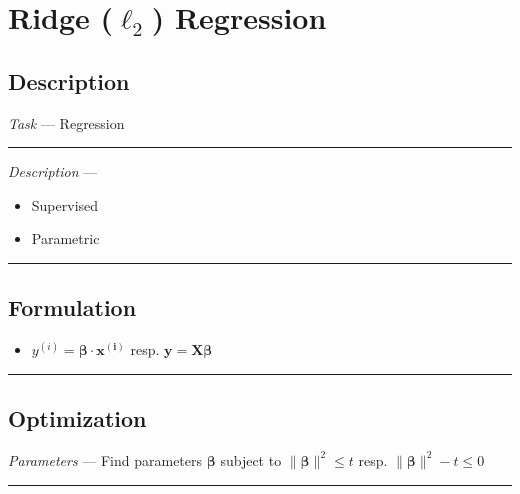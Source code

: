 \section{Ridge ($\ell_2$) Regression}
\subsection*{Description}
\emph{Task} --- Regression

{\color{lightgray}\hrule height 0.001mm}

\emph{Description} --- 
\begin{itemize}
    \item Supervised 
    \item Parametric
\end{itemize}

{\color{black}\hrule height 0.001mm}

\subsection*{Formulation}

\begin{itemize}
    \item $y^{(i)} = \boldsymbol{\beta} \cdot \boldsymbol{x^{(i)}}$ resp. $\boldsymbol{y} = \boldsymbol{X}\boldsymbol{\beta}$
\end{itemize}

{\color{black}\hrule height 0.001mm}

\subsection*{Optimization}
\emph{Parameters} --- Find parameters $\boldsymbol{\beta}$ subject to $\|\boldsymbol{\beta}\|^2 \leq t$ resp. $\|\boldsymbol{\beta}\|^2 - t \leq 0$

{\color{lightgray}\hrule height 0.001mm}


